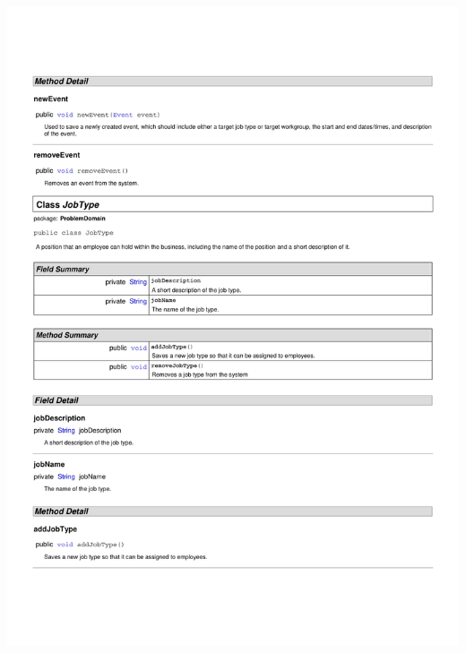 \documentclass[letterpaper,12pt]{report}
\begin{document}
\includegraphics[scale=0.9,trim=20mm 30mm 25mm 25mm]{externals/ProblemDomainDataDictionary5.pdf}
\newpage
\end{document}
